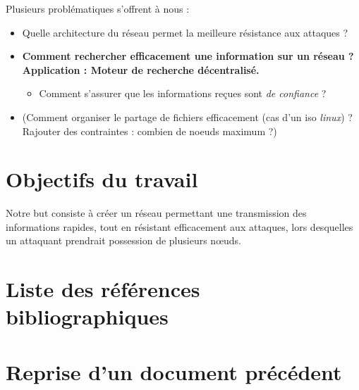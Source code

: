 \documentclass[11pt,a4paper]{article}
\begin{document}
Plusieurs problématiques s'offrent à nous :
\begin{itemize}
	\item Quelle architecture du réseau permet la meilleure résistance aux attaques ?
	\item \textbf{Comment rechercher efficacement une information sur un réseau ? Application : Moteur de recherche décentralisé.}
	\begin{itemize}
		\item Comment s'assurer que les informations reçues sont \emph{de confiance} ?
	\end{itemize}
	
	\item (Comment organiser le partage de fichiers efficacement (cas d'un iso \emph{linux}) ? Rajouter des contraintes : combien de noeuds maximum ?)
	
\end{itemize}

\section{Objectifs du travail}

Notre but consiste à créer un réseau permettant une transmission des informations rapides, tout en résistant efficacement aux attaques, lors desquelles un attaquant prendrait possession de plusieurs n{\oe}uds.

\section{Liste des références bibliographiques}

%
%
%

\section{Reprise d'un document précédent}
\end{document}
